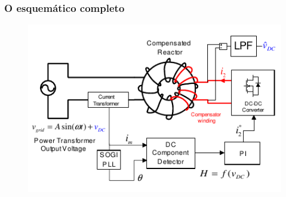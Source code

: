 \documentclass{beamer}
\begin{document}
\begin{frame}
    \frametitle{O esquemático completo}

    \begin{figure}
        \includegraphics[width=.8\linewidth]{fig4.png}
    \end{figure}
\end{frame}
\end{document}
